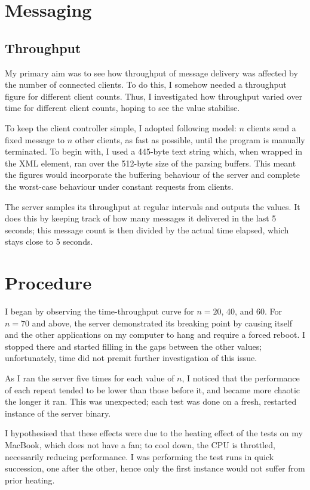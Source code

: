 \documentclass[12pt,a4paper,twoside,openright]{report}
\begin{document}
{\section{Messaging}
\subsection{Throughput}
My primary aim was to see how throughput of message delivery was affected by the number of connected clients. To do this, I somehow needed a throughput figure for different client counts. Thus, I investigated how throughput varied over time for different client counts, hoping to see the value stabilise.

To keep the client controller simple, I adopted following model: $n$ clients send a fixed message to $n$ other clients, as fast as possible, until the program is manually terminated. To begin with, I used a 445-byte text string which, when wrapped in the XML  element, ran over the 512-byte size of the parsing buffers. This meant the figures would incorporate the buffering behaviour of the server and complete the worst-case behaviour under constant requests from clients.

The server samples its throughput at regular intervals and outputs the values. It does this by keeping track of how many messages it delivered in the last 5 seconds; this message count is then divided by the actual time elapsed, which stays close to 5 seconds.

\section{Procedure}
I began by observing the time-throughput curve for $n=20$, 40, and 60. For $n=70$ and above, the server demonstrated its breaking point by causing itself and the other applications on my computer to hang and require a forced reboot. I stopped there and started filling in the gaps between the other values; unfortunately, time did not premit further investigation of this issue.

As I ran the server five times for each value of $n$, I noticed that the performance of each repeat tended to be lower than those before it, and became more chaotic the longer it ran. This was unexpected; each test was done on a fresh, restarted instance of the server binary.

I hypothesised that these effects were due to the heating effect of the tests on my MacBook, which does not have a fan; to cool down, the CPU is throttled, necessarily reducing performance. I was performing the test runs in quick succession, one after the other, hence only the first instance would not suffer from prior heating.

}
\end{document}

